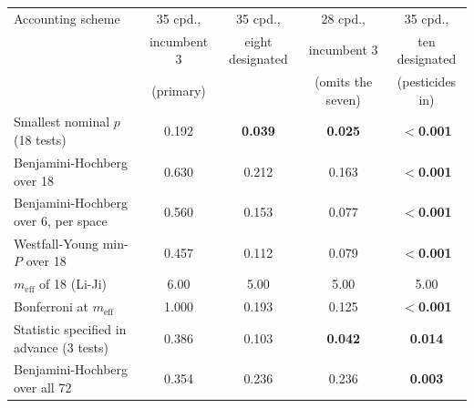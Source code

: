 \begin{tabular}{lcccc}
\hline
Accounting scheme & 35 cpd., & 35 cpd., & 28 cpd., & 35 cpd., \\
                  & incumbent 3 & eight designated & incumbent 3 & ten designated \\
                  & (primary) &  & (omits the seven) & (pesticides in) \\
\hline
Smallest nominal $p$ (18 tests)          & 0.192 & \textbf{0.039} & \textbf{0.025} & \textbf{$<$0.001} \\
Benjamini-Hochberg over 18               & 0.630 & 0.212 & 0.163 & \textbf{$<$0.001} \\
Benjamini-Hochberg over 6, per space     & 0.560 & 0.153 & 0.077 & \textbf{$<$0.001} \\
Westfall-Young min-$P$ over 18           & 0.457 & 0.112 & 0.079 & \textbf{$<$0.001} \\
$m_{\mathrm{eff}}$ of 18 (Li-Ji)         & 6.00  & 5.00  & 5.00  & 5.00  \\
Bonferroni at $m_{\mathrm{eff}}$         & 1.000 & 0.193 & 0.125 & \textbf{$<$0.001} \\
Statistic specified in advance (3 tests) & 0.386 & 0.103 & \textbf{0.042} & \textbf{0.014} \\
Benjamini-Hochberg over all 72           & 0.354 & 0.236 & 0.236 & \textbf{0.003} \\
\hline
\end{tabular}
